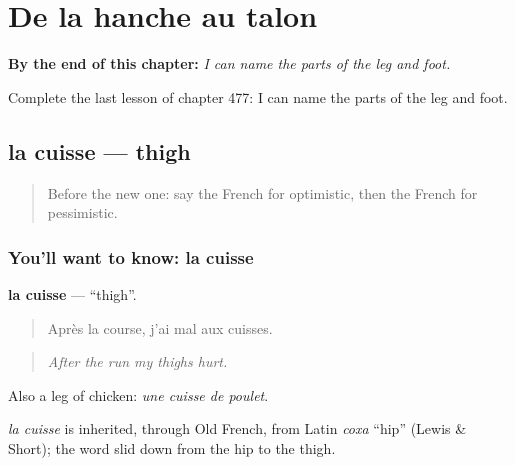 
\chapter{De la hanche au talon}
\label{ch:fr-de-la-hanche-au-talon}

\begin{chapteropening}
\textbf{By the end of this chapter:} \emph{I can name the parts of the leg and foot.}

Complete the last lesson of chapter 477: I can name the parts of the leg and foot.
\end{chapteropening}

\section[la cuisse]{la cuisse — thigh}

\label{lesson:FR-C477-cuisse}



\begin{quote}
Before the new one: say the French for optimistic, then the French for pessimistic.
\end{quote}

\subsection*{You'll want to know: la cuisse}
\textbf{la cuisse} — \textquotedblleft{}thigh\textquotedblright{}.

\begin{quote}
Après la course, j'ai mal aux cuisses.
\end{quote}

\begin{quote}
\emph{After the run my thighs hurt.}
\end{quote}

Also a leg of chicken: \emph{une cuisse de poulet}.

\begin{cousinweb}
\emph{la cuisse} is inherited, through Old French, from Latin \emph{coxa} \textquotedblleft{}hip\textquotedblright{} (Lewis \& Short); the word slid down from the hip to the thigh.
\end{cousinweb}

